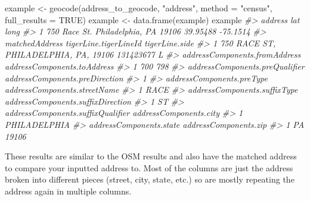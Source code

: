 \documentclass[
]{krantz}
\makeatletter
\newenvironment{Shaded}{\begin{snugshade}}{\end{snugshade}}
\newcommand{\AttributeTok}[1]{\textcolor[rgb]{0.61,0.61,0.61}{#1}}
\newcommand{\CommentTok}[1]{\textcolor[rgb]{0.37,0.37,0.37}{\textit{#1}}}
\newcommand{\ConstantTok}[1]{\textcolor[rgb]{0,0,0}{#1}}
\newcommand{\FunctionTok}[1]{\textcolor[rgb]{0,0,0}{#1}}
\newcommand{\NormalTok}[1]{#1}
\newcommand{\OtherTok}[1]{\textcolor[rgb]{0.37,0.37,0.37}{#1}}
\newcommand{\StringTok}[1]{\textcolor[rgb]{0.5,0.5,0.5}{#1}}
\newenvironment{kframe}{%
\medskip{}
\setlength{\fboxsep}{.8em}
 \def\at@end@of@kframe{}%
 \ifinner\ifhmode%
  \def\at@end@of@kframe{\end{minipage}}%
  \begin{minipage}{\columnwidth}%
 \fi\fi%
 \def\FrameCommand##1{\hskip\@totalleftmargin \hskip-\fboxsep
 \colorbox{shadecolor}{##1}\hskip-\fboxsep
     \hskip-\linewidth \hskip-\@totalleftmargin \hskip\columnwidth}%
 \MakeFramed {\advance\hsize-\width
   \@totalleftmargin\z@ \linewidth\hsize
   \@setminipage}}%
 {\par\unskip\endMakeFramed%
 \at@end@of@kframe}
\renewenvironment{Shaded}{\begin{kframe}}{\end{kframe}}
\makeatother
\begin{document}
\begin{Shaded}
\begin{Highlighting}[]
\NormalTok{example }\OtherTok{\textless{}{-}} \FunctionTok{geocode}\NormalTok{(address\_to\_geocode, }\StringTok{"address"}\NormalTok{, }
                   \AttributeTok{method =} \StringTok{"census"}\NormalTok{, }\AttributeTok{full\_results =} \ConstantTok{TRUE}\NormalTok{)}
\NormalTok{example }\OtherTok{\textless{}{-}} \FunctionTok{data.frame}\NormalTok{(example)}
\NormalTok{example}
\CommentTok{\#\textgreater{}                               address      lat     long}
\CommentTok{\#\textgreater{} 1 750 Race St. Philadelphia, PA 19106 39.95488 {-}75.1514}
\CommentTok{\#\textgreater{}                         matchedAddress tigerLine.tigerLineId tigerLine.side}
\CommentTok{\#\textgreater{} 1 750 RACE ST, PHILADELPHIA, PA, 19106             131423677              L}
\CommentTok{\#\textgreater{}   addressComponents.fromAddress addressComponents.toAddress}
\CommentTok{\#\textgreater{} 1                           700                         798}
\CommentTok{\#\textgreater{}   addressComponents.preQualifier addressComponents.preDirection}
\CommentTok{\#\textgreater{} 1                                                              }
\CommentTok{\#\textgreater{}   addressComponents.preType addressComponents.streetName}
\CommentTok{\#\textgreater{} 1                                                   RACE}
\CommentTok{\#\textgreater{}   addressComponents.suffixType addressComponents.suffixDirection}
\CommentTok{\#\textgreater{} 1                           ST                                  }
\CommentTok{\#\textgreater{}   addressComponents.suffixQualifier addressComponents.city}
\CommentTok{\#\textgreater{} 1                                             PHILADELPHIA}
\CommentTok{\#\textgreater{}   addressComponents.state addressComponents.zip}
\CommentTok{\#\textgreater{} 1                      PA                 19106}
\end{Highlighting}
\end{Shaded}

These results are similar to the OSM results and also have the matched address to compare your inputted address to. Most of the columns are just the address broken into different pieces (street, city, state, etc.) so are mostly repeating the address again in multiple columns.
\end{document}
